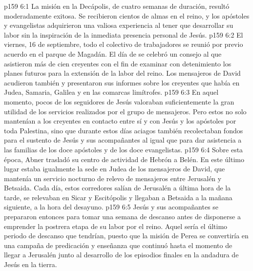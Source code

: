 \vs p159 6:1 La misión en la Decápolis, de cuatro semanas de duración, resultó moderadamente exitosa. Se recibieron cientos de almas en el reino, y los apóstoles y evangelistas adquirieron una valiosa experiencia al tener que desarrollar su labor sin la inspiración de la inmediata presencia personal de Jesús.
\vs p159 6:2 El viernes, 16 de septiembre, todo el colectivo de trabajadores se reunió por previo acuerdo en el parque de Magadán. El día de  se celebró un consejo al que asistieron más de cien creyentes con el fin de examinar con detenimiento los planes futuros para la extensión de la labor del reino. Los mensajeros de David acudieron también y presentaron sus informes sobre los creyentes que había en Judea, Samaria, Galilea y en las comarcas limítrofes.
\vs p159 6:3 En aquel momento, pocos de los seguidores de Jesús valoraban suficientemente la gran utilidad de los servicios realizados por el grupo de mensajeros. Pero estos no solo mantenían a los creyentes en contacto entre sí y con Jesús y los apóstoles por toda Palestina, sino que durante estos días aciagos también recolectaban fondos para el sustento de Jesús y sus acompañantes al igual que para dar asistencia a las familias de los doce apóstoles y de los doce evangelistas.
\vs p159 6:4 Sobre esta época, Abner trasladó su centro de actividad de Hebrón a Belén. En este último lugar estaba igualmente la sede en Judea de los mensajeros de David, que mantenía un servicio nocturno de relevo de mensajeros entre Jerusalén y Betsaida. Cada día, estos corredores salían de Jerusalén a última hora de la tarde, se relevaban en Sicar y Escitópolis y llegaban a Betsaida a la mañana siguiente, a la hora del desayuno.
\vs p159 6:5 Jesús y sus acompañantes se prepararon entonces para tomar una semana de descanso antes de disponerse a emprender la postrera etapa de su labor por el reino. Aquel sería el último periodo de descanso que tendrían, puesto que la misión de Perea se convertiría en una campaña de predicación y enseñanza que continuó hasta el momento de llegar a Jerusalén junto al desarrollo de los episodios finales en la andadura de Jesús en la tierra.
